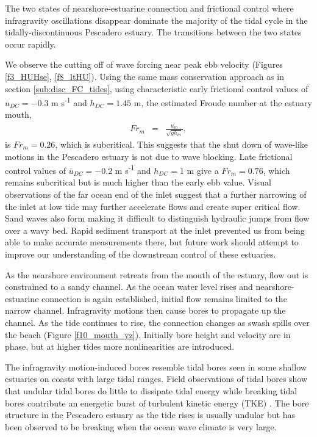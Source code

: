 The two states of nearshore-estuarine connection and frictional control
where infragravity oscillations disappear dominate the majority of
the tidal cycle in the tidally-discontinuous Pescadero estuary. The
transitions between the two states occur rapidly. 

We observe the cutting off of wave forcing near peak ebb velocity
(Figures \ref{f3_HUHse}, \ref{f8_ltHU}). Using the same mass conservation
approach as in section \ref{sub:disc_FC_tides}, using characteristic
early frictional control values of $\overline{{u}}{}_{DC}=-0.3$ m
s\textsuperscript{-1} and $h_{DC}=1.45$ m, the estimated Froude
number at the estuary mouth,
\begin{eqnarray}
Fr_{m} & = & \frac{\overline{u_{m}}}{\sqrt{gh_{m}}},\label{eq:Fr}
\end{eqnarray}
is $Fr_{m}=0.26$, which is subcritical. This suggests that the shut
down of wave-like motions in the Pescadero estuary is not due to wave
blocking. Late frictional control values of $\overline{{u}}{}_{DC}=-0.2$
m s\textsuperscript{-1} and $h_{DC}=1$ m give a $Fr_{m}=0.76$,
which remains subcritical but is much higher than the early ebb value.
Visual observations of the far ocean end of the inlet suggest that
a further narrowing of the inlet at low tide may further accelerate
flows and create super critical flow. Sand waves also form making
it difficult to distinguish hydraulic jumps from flow over a wavy
bed. Rapid sediment transport at the inlet prevented us from being
able to make accurate measurements there, but future work should attempt
to improve our understanding of the downstream control of these estuaries. 

As the nearshore environment retreats from the mouth of the estuary,
flow out is constrained to a sandy channel. As the ocean water level
rises and nearshore-estuarine connection is again established, initial
flow remains limited to the narrow channel. Infragravity motions then
cause bores to propagate up the channel. As the tide continues to
rise, the connection changes as swash spills over the beach (Figure
\ref{f10_mouth_yz}). Initially bore height and velocity are in phase,
but at higher tides more nonlinearities are introduced.

The infragravity motion-induced bores resemble tidal bores seen in
some shallow estuaries on coasts with large tidal ranges. Field observations
of tidal bores show that undular tidal bores do little to dissipate
tidal energy \citep{wolanski_etal_2004} while breaking tidal bores
contribute an energetic burst of turbulent kinetic energy (TKE) \emph{\citep{simpson_etal_2004}.
} The bore structure in the Pescadero estuary as the tide rises is
usually undular but has been observed to be breaking when the ocean
wave climate is very large. 


